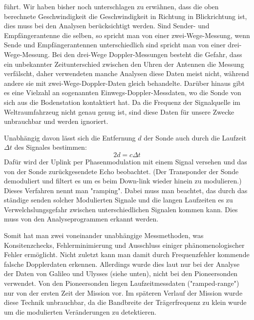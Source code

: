 führt.
Wir haben bisher noch unterschlagen zu erwähnen, dass die oben berechnete Geschwindigkeit die Geschwindigkeit in Richtung in Blickrichtung ist, dies muss bei den Analysen berücksichtigt werden. %
Sind Sender- und Empfängerantenne die selben, so spricht man von einer zwei-Wege-Messung, wenn Sende und Empfängerantennen unterschiedlich sind spricht man von einer drei-Wege-Messung.\cite{Levy2009} Bei den drei-Wege Doppler-Messungen besteht die Gefahr, dass ein unbekannter Zeitunterschied zwischen den Uhren der Antennen die Messung verfälscht, daher verwendeten manche Analysen diese Daten meist nicht,\cite{Anderson2002} während andere sie mit zwei-Wege-Doppler-Daten gleich behandelte.\cite{Markwardt2002} Darüber hinaus gibt es eine Vielzahl an sogenannten Einwegs-Doppler-Messdaten, wo die Sonde von sich aus die Bodenstation kontaktiert hat. Da die Frequenz der Signalquelle im Weltraumfahrzeug nicht genau genug ist, sind diese Daten für unsere Zwecke unbrauchbar und werden ignoriert. %

Unabhängig davon lässt sich die Entfernung $d$ der Sonde auch durch die Laufzeit $\Delta t$ des Signales bestimmen:
\begin{equation}
 2d = c \Delta t
\end{equation}
Dafür wird der Uplink per Phasenmodulation mit einem Signal versehen und das von der Sonde zurückgesendete Echo beobachtet. (Der Transponder der Sonde demoduliert und filtert es um es beim Down-link wieder hinein zu modulieren.) Dieses Verfahren nennt man "ramping". %
Dabei muss man beachtet, das durch das ständige senden solcher Modulierten Signale und die langen Laufzeiten es zu Verwelchslungsgefahr zwischen unterschiedlichen Signalen kommen kann. Dies muss von den Analyseprogrammen erkannt werden.

Somit hat man zwei voneinander unabhängige Messmethoden, was Konsitenzchecks,
Fehlerminimierung und Ausschluss einiger phänomenologischer Fehler ermöglicht. Nicht zuletzt kann man damit durch Frequenzfehler kommende falsche Dopplerdaten erkennen.\cite{Anderson2002}
Allerdings wurde dies laut \cite{Anderson2002} nur bei der Analyse der Daten von Galileo und Ulysses (siehe unten), nicht bei den Pioneersonden verwendet. Von den Pioneersonden liegen Laufzeitmessdaten ("ramped-range") nur von der ersten Zeit der Mission vor. Im späteren Verlauf der Mission wurde diese Technik unbrauchbar, da die Bandbreite der Trägerfrequenz zu klein wurde um die modulierten Veränderungen zu detektieren.\cite{Turyshev2010} %

